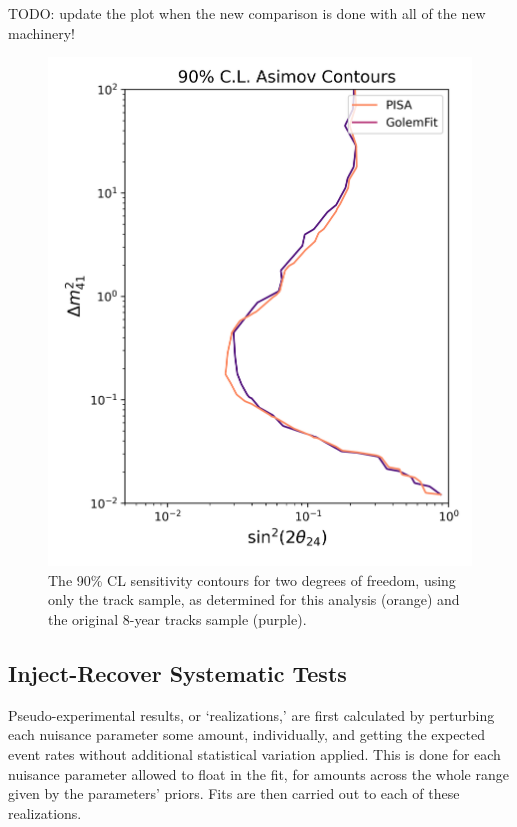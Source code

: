 \documentclass[main.tex]{subfiles}
\begin{document}
TODO: update the plot when the new comparison is done with all of the new machinery! 

\begin{figure}
    \centering
    \includegraphics[width=0.6\linewidth]{figures/2d_compare_llh.png}
    \caption{The 90\% CL sensitivity contours for two degrees of freedom, using only the track sample, as determined for this analysis (orange) and the original 8-year tracks sample (purple).}\label{fig:comparison}
\end{figure}

\subsection{Inject-Recover Systematic Tests}

Pseudo-experimental results, or `realizations,' are first calculated by perturbing each nuisance parameter some amount, individually, and getting the expected event rates without additional statistical variation applied. 
This is done for each nuisance parameter allowed to float in the fit, for amounts across the whole range given by the parameters' priors. 
Fits are then carried out to each of these realizations.
\end{document}
